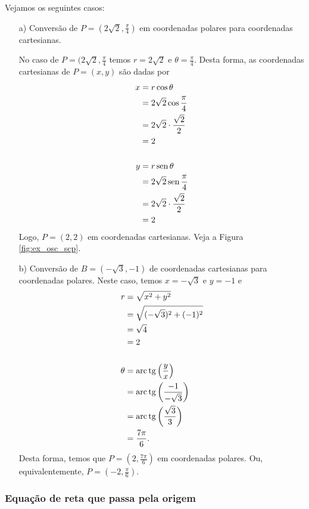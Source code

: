 \begin{ex}
  Vejamos os seguintes casos:
  \begin{enumerate}
  \item[a)] Conversão de $P=(2\sqrt{2}, \frac{\pi}{4})$ em coordenadas polares para coordenadas cartesianas.

    No caso de $P=(2\sqrt{2}, \frac{\pi}{4}$ temos $r=2\sqrt{2}$ e $\theta = \frac{\pi}{4}$. Desta forma, as coordenadas cartesianas de $P=(x,y)$ são dadas por
    \begin{align}
      x &= r\cos\theta \\
        &= 2\sqrt{2}\cos\frac{\pi}{4}\\
        &= 2\sqrt{2}\cdot \frac{\sqrt{2}}{2}\\
        &= 2\\
      ~&~\nonumber\\
      y &= r\operatorname{sen}\theta\\
        &= 2\sqrt{2}\operatorname{sen}\frac{\pi}{4}\\
        &= 2\sqrt{2}\cdot\frac{\sqrt{2}}{2}\\
        &= 2
    \end{align}
    Logo, $P=(2,2)$ em coordenadas cartesianas. Veja a Figura \ref{fig:ex_osc_scp}.

  \item[b)] Conversão de $B=(-\sqrt{3}, -1)$ de coordenadas cartesianas para coordenadas polares. Neste caso, temos $x=-\sqrt{3}$ e $y=-1$ e
    \begin{align}
      r &= \sqrt{x^2 + y^2} \\
        &= \sqrt{(-\sqrt{3})^2 + (-1)^2}\\
        &= \sqrt{4} \\
        &= 2\\
      ~&~\nonumber\\
      \theta &= \operatorname{arc}\operatorname{tg}\left(\frac{y}{x}\right)\\
        &= \operatorname{arc}\operatorname{tg}\left(\frac{-1}{-\sqrt{3}}\right)\\
        &= \operatorname{arc}\operatorname{tg}\left(\frac{\sqrt{3}}{3}\right)\\
        &= \frac{7\pi}{6}.
    \end{align}
    Desta forma, temos que $P=(2, \frac{7\pi}{6})$ em coordenadas polares. Ou, equivalentemente, $P=(-2, \frac{\pi}{6})$.
  \end{enumerate}
\end{ex}

\subsubsection{Equação de reta que passa pela origem}

